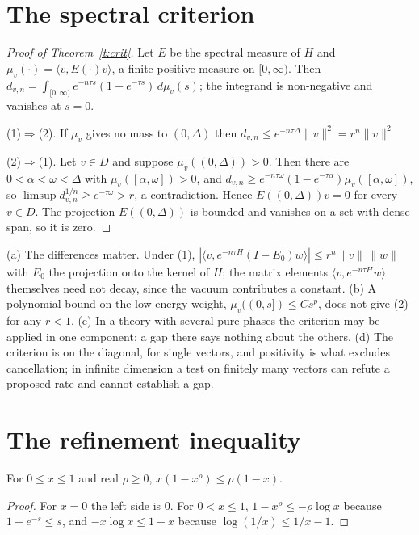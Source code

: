 \section{The spectral criterion}\label{s:crit}
\begin{proof}[Proof of Theorem~\ref{t:crit}]
Let $E$ be the spectral measure of $H$ and $\mu_v(\cdot)=\langle v,E(\cdot)v\rangle$, a finite positive measure
on $[0,\infty)$. Then $d_{v,n}=\int_{[0,\infty)}e^{-n\tau s}(1-e^{-\tau s})\,d\mu_v(s)$; the integrand is
non-negative and vanishes at $s=0$.

(1)$\Rightarrow$(2). If $\mu_v$ gives no mass to $(0,\Delta)$ then $d_{v,n}\le e^{-n\tau\Delta}\|v\|^2=r^n\|v\|^2$.

(2)$\Rightarrow$(1). Let $v\in D$ and suppose $\mu_v((0,\Delta))>0$. Then there are $0<\alpha<\omega<\Delta$ with
$\mu_v([\alpha,\omega])>0$, and $d_{v,n}\ge e^{-n\tau\omega}(1-e^{-\tau\alpha})\mu_v([\alpha,\omega])$, so
$\limsup d_{v,n}^{1/n}\ge e^{-\tau\omega}>r$, a contradiction. Hence $E((0,\Delta))v=0$ for every $v\in D$.
The projection $E((0,\Delta))$ is bounded and vanishes on a set with dense span, so it is zero.
\end{proof}

\begin{remark}\label{r:crit}
(a) The differences matter. Under (1), $|\langle v,e^{-n\tau H}(I-E_0)w\rangle|\le r^n\|v\|\,\|w\|$ with $E_0$ the
projection onto the kernel of $H$; the matrix elements $\langle v,e^{-n\tau H}w\rangle$ themselves need not decay,
since the vacuum contributes a constant. (b) A polynomial bound on the low-energy weight,
$\mu_v((0,s])\le Cs^p$, does not give (2) for any $r<1$. (c) In a theory with several pure phases the criterion
may be applied in one component; a gap there says nothing about the others. (d) The criterion is on the
diagonal, for single vectors, and positivity is what excludes cancellation; in infinite dimension a test
on finitely many vectors can refute a proposed rate and cannot establish a gap.
\end{remark}

\section{The refinement inequality}\label{s:inh}
\begin{lemma}\label{l:scal}
For $0\le x\le1$ and real $\rho\ge0$, $x(1-x^\rho)\le\rho(1-x)$.
\end{lemma}
\begin{proof}
For $x=0$ the left side is $0$. For $0<x\le1$, $1-x^\rho\le-\rho\log x$ because $1-e^{-s}\le s$, and
$-x\log x\le1-x$ because $\log(1/x)\le1/x-1$.
\end{proof}

